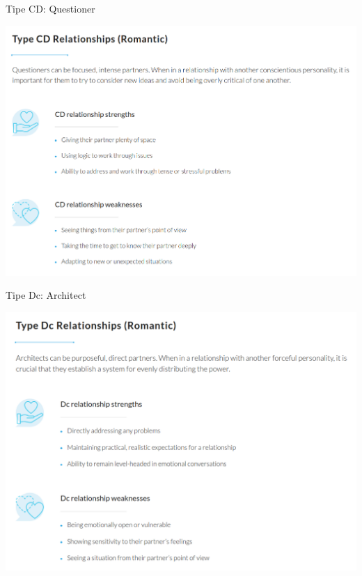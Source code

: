 \documentclass{beamer}
\theoremstyle{mystyle}
\begin{document}
\begin{frame}{Tipe CD: Questioner}
	\begin{center}
		\includegraphics[scale=.275]{images/CD}
	\end{center}
\end{frame}

\begin{frame}{Tipe Dc: Architect}
	\begin{center}
		\includegraphics[scale=.275]{images/Dc}
	\end{center}
\end{frame}



\end{document}
